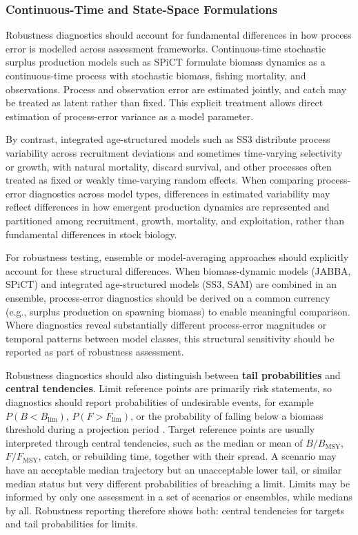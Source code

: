 \documentclass[11pt,a4paper]{article}
\begin{document}
\subsubsection{Continuous-Time and State-Space Formulations}

Robustness diagnostics should account for fundamental differences in how process error is modelled across assessment frameworks. Continuous-time stochastic surplus production models such as SPiCT \citep{pedersen2017spict} formulate biomass dynamics as a continuous-time process with stochastic biomass, fishing mortality, and observations. Process and observation error are estimated jointly, and catch may be treated as latent rather than fixed. This explicit treatment allows direct estimation of process-error variance as a model parameter.

By contrast, integrated age-structured models such as SS3 distribute process variability across recruitment deviations and sometimes time-varying selectivity or growth, with natural mortality, discard survival, and other processes often treated as fixed or weakly time-varying random effects. When comparing process-error diagnostics across model types, differences in estimated variability may reflect differences in how emergent production dynamics are represented and partitioned among recruitment, growth, mortality, and exploitation, rather than fundamental differences in stock biology.

For robustness testing, ensemble or model-averaging approaches should explicitly account for these structural differences. When biomass-dynamic models (JABBA, SPiCT) and integrated age-structured models (SS3, SAM) are combined in an ensemble, process-error diagnostics should be derived on a common currency (e.g., surplus production on spawning biomass) to enable meaningful comparison. Where diagnostics reveal substantially different process-error magnitudes or temporal patterns between model classes, this structural sensitivity should be reported as part of robustness assessment.

Robustness diagnostics should also distinguish between \textbf{tail probabilities} and \textbf{central tendencies}. Limit reference points are primarily risk statements, so diagnostics should report probabilities of undesirable events, for example $P(B < B_{\mathrm{lim}})$, $P(F > F_{\mathrm{lim}})$, or the probability of falling below a biomass threshold during a projection period \citep{Roux2022,Fischer2023}. Target reference points are usually interpreted through central tendencies, such as the median or mean of $B/B_{\mathrm{MSY}}$, $F/F_{\mathrm{MSY}}$, catch, or rebuilding time, together with their spread. A scenario may have an acceptable median trajectory but an unacceptable lower tail, or similar median status but very different probabilities of breaching a limit. Limits may be informed by only one assessment in a set of scenarios or ensembles, while medians by all. Robustness reporting therefore shows both: central tendencies for targets and tail probabilities for limits.
\end{document}
